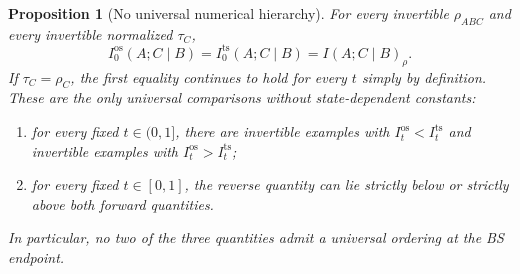 \documentclass[11pt]{article}
\newtheorem{proposition}[proposition]{Proposition}
\theoremstyle{remark}
\DeclareMathOperator{\os}{os}
\DeclareMathOperator{\ts}{ts}
\newcommand{\1}{\mathbbm{1}}
\begin{document}
\begin{proposition}[No universal numerical hierarchy]
\label{prop:consolidated-CMI-incomparability}
For every invertible $\rho_{ABC}$ and every invertible normalized
$\tau_C$,
\begin{equation}
 I_0^{\os}(A;C\mid B)=I_0^{\ts}(A;C\mid B)
 =I(A;C\mid B)_\rho.
 \label{eq:consolidated-forward-CMI-tzero}
\end{equation}
If $\tau_C=\rho_C$, the first equality continues to hold for every
$t$ simply by definition.  These are the only universal comparisons
without state-dependent constants:
\begin{enumerate}[label=\textnormal{(\roman*)}]
 \item for every fixed $t\in(0,1]$, there are invertible examples with
 $I_t^{\os}<I_t^{\ts}$ and invertible examples with
 $I_t^{\os}>I_t^{\ts}$;
 \item for every fixed $t\in[0,1]$, the reverse quantity can lie
 strictly below or strictly above both forward quantities.
\end{enumerate}
In particular, no two of the three quantities admit a universal
ordering at the BS endpoint.
\end{proposition}
\end{document}

